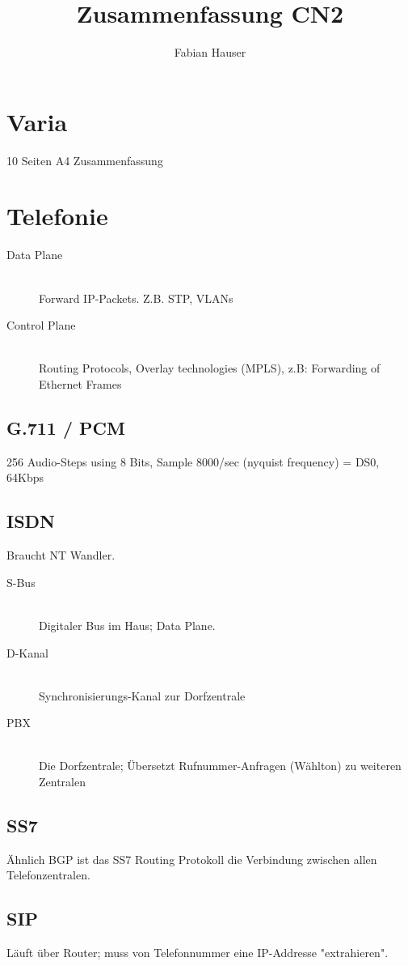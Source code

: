 

\title{Zusammenfassung CN2}
\author{Fabian Hauser}
 

\maketitle

\section{Varia}
10 Seiten A4 Zusammenfassung

\section{Telefonie}

\begin{description}
\item[Data Plane] \hfill \\
	Forward IP-Packets. Z.B. STP, VLANs
\item[Control Plane] \hfill \\
	Routing Protocols, Overlay technologies (MPLS), z.B: Forwarding of Ethernet Frames
\end{description}


\subsection{G.711 / PCM}
 256 Audio-Steps using 8 Bits, Sample 8000/sec (nyquist frequency) = DS0, 64Kbps


\subsection{ISDN}
Braucht NT Wandler.

\begin{description}
\item[S-Bus] \hfill \\
	 Digitaler Bus im Haus; Data Plane.
\item[D-Kanal] \hfill \\
	Synchronisierungs-Kanal zur Dorfzentrale
\item[PBX] \hfill \\
	Die Dorfzentrale; Übersetzt Rufnummer-Anfragen (Wählton) zu weiteren Zentralen

\end{description}

\subsection{SS7}

Ähnlich BGP ist das SS7 Routing Protokoll die Verbindung zwischen allen Telefonzentralen.
	
\subsection{SIP}
Läuft über Router; muss von Telefonnummer eine IP-Addresse "extrahieren".
	

